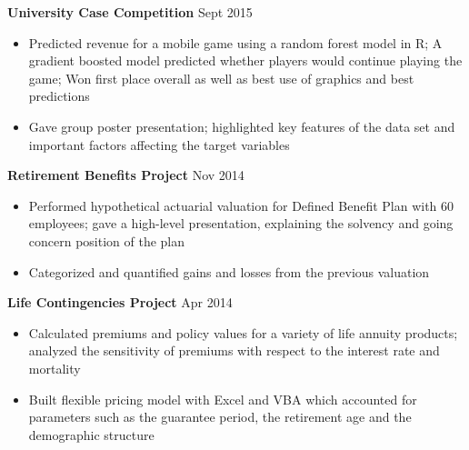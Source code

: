 \documentclass[11pt]{article}
\begin{document}
\medskip
{}
%
\vspace{1mm}
\begin{addmargin}[2.75em]{0em}
\textbf{University Case Competition} \hfill Sept 2015
\end{addmargin}
%
\vspace{1mm}
\begin{addmargin}[1.75em]{0em}
\begin{itemize}
\setlength\itemsep{-0.4em}
\item Predicted revenue for a mobile game using a random forest model in R; A gradient boosted model predicted whether players would continue playing the game; Won first place overall as well as best use of graphics and best predictions
\item Gave group poster presentation; highlighted key features of the data set and important factors affecting the target variables
\end{itemize}
\end{addmargin}
%
\vspace{2mm}
\begin{addmargin}[2.75em]{0em}
\textbf{Retirement Benefits Project} \hfill Nov 2014
\end{addmargin}
%
\vspace{1mm}
\begin{addmargin}[1.75em]{0em}
\begin{itemize}
\setlength\itemsep{-0.4em}
\item Performed hypothetical actuarial valuation for Defined Benefit Plan with 60 employees; gave a high-level presentation, explaining the solvency and going concern position of the plan
\item Categorized and quantified gains and losses from the previous valuation
\end{itemize}
\end{addmargin}
%
\vspace{2mm}
\begin{addmargin}[2.75em]{0em}
\textbf{Life Contingencies Project} \hfill Apr 2014
\end{addmargin}
%
\vspace{1mm}
\begin{addmargin}[1.75em]{0em}
\begin{itemize}
\setlength\itemsep{-0.4em}
\item Calculated premiums and policy values for a variety of life annuity products; analyzed the sensitivity of premiums with respect to the interest rate and mortality
\item Built flexible pricing model with Excel and VBA which accounted for parameters such as the guarantee period, the retirement age and the demographic structure
\end{itemize}
\end{addmargin}
\end{document}
